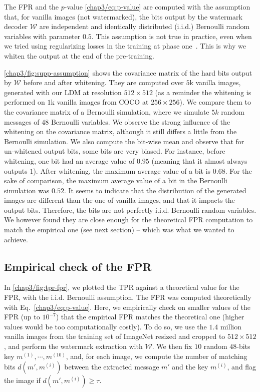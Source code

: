 The FPR and the $p$-value \eqref{chap3/eq:p-value} are computed with the assumption that, for vanilla images (not watermarked),
the bits output by the watermark decoder $\mathcal{W}$ are independent and identically distributed (i.i.d.) Bernoulli random variables with parameter $0.5$.
This assumption is not true in practice, even when we tried using regularizing losses in the training at phase one~\citep{bardes2022vicreg, sablayrolles2018catalyser}.
This is why we whiten the output at the end of the pre-training.

\autoref{chap3/fig:supp-assumption} shows the covariance matrix of the hard bits output by $\mathcal{W}$ before and after whitening. 
They are computed over $5$k vanilla images, generated with our LDM at resolution $512\times512$ (as a reminder the whitening is performed on $1$k vanilla images from COCO at $256\times256$).
We compare them to the covariance matrix of a Bernoulli simulation, where we simulate $5k$ random messages of $48$ Bernoulli variables.
We observe the strong influence of the whitening on the covariance matrix, although it still differs a little from the Bernoulli simulation.
We also compute the bit-wise mean and observe that for un-whitened output bits, some bits are very biased.  
For instance, before whitening, one bit had an average value of $0.95$ (meaning that it almost always outputs $1$).
After whitening, the maximum average value of a bit is $0.68$.
For the sake of comparison, the maximum average value of a bit in the Bernoulli simulation was $0.52$.
It seems to indicate that the distribution of the generated images are different than the one of vanilla images, and that it impacts the output bits.
Therefore, the bits are not perfectly i.i.d. Bernoulli random variables. 
We however found they are close enough for the theoretical FPR computation to match the empirical one (see next section) -- which was what we wanted to achieve.





\subsection{Empirical check of the FPR}\label{chap3/app:fpr-check}
In \autoref{chap3/fig:tpr-fpr}, we plotted the TPR against a theoretical value for the FPR, with the i.i.d. Bernoulli assumption.
The FPR was computed theoretically with Eq.~\eqref{chap3/eq:p-value}.
Here, we empirically check on smaller values of the FPR (up to $10^{-7}$) that the empirical FPR matches the theoretical one (higher values would be too computationally costly).
To do so, we use the $1.4$ million vanilla images from the training set of ImageNet resized and cropped to $512\times512$, and perform the watermark extraction with $\mathcal{W}$.
We then fix $10$ random $48$-bits key $m^{(1)},\cdots, m^{(10)}$, and, for each image, we compute the number of matching bits $d(m', m^{(i)})$ between the extracted message $m'$ and the key $m^{(i)}$, and flag the image if $d(m', m^{(i)})\geq \tau$.

